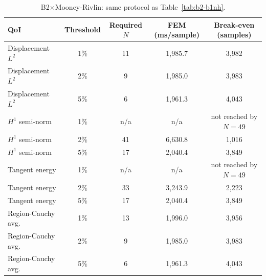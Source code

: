 \documentclass[final,5p,times]{elsarticle}
\begin{document}
\begin{table}[ht]
\centering
\caption{B2$\times$Mooney-Rivlin: same protocol as Table~\ref{tab:b2-b1nh}.}
\label{tab:b2-b2mr}
\small
\begin{tabular}{lcccc}
\toprule
QoI & Threshold & Required $N$ & FEM (ms/sample) & Break-even (samples) \\
\midrule
Displacement $L^2$  & 1\% & 11  & 1{,}985.7 & 3{,}982 \\
Displacement $L^2$  & 2\% & 9   & 1{,}985.0 & 3{,}983 \\
Displacement $L^2$  & 5\% & 6   & 1{,}961.3 & 4{,}043 \\
$H^1$ semi-norm     & 1\% & n/a & n/a       & not reached by $N{=}49$ \\
$H^1$ semi-norm     & 2\% & 41  & 6{,}630.8 & 1{,}016 \\
$H^1$ semi-norm     & 5\% & 17  & 2{,}040.4 & 3{,}849 \\
Tangent energy      & 1\% & n/a & n/a       & not reached by $N{=}49$ \\
Tangent energy      & 2\% & 33  & 3{,}243.9 & 2{,}223 \\
Tangent energy      & 5\% & 17  & 2{,}040.4 & 3{,}849 \\
Region-Cauchy avg.\ & 1\% & 13  & 1{,}996.0 & 3{,}956 \\
Region-Cauchy avg.\ & 2\% & 9   & 1{,}985.0 & 3{,}983 \\
Region-Cauchy avg.\ & 5\% & 6   & 1{,}961.3 & 4{,}043 \\
\bottomrule
\end{tabular}
\end{table}
\end{document}
